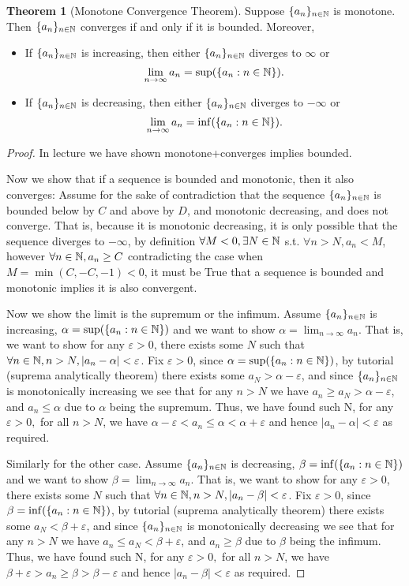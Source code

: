 \documentclass{homework}
\newcommand{\N}{\bb{N}} %
\newcommand{\ra}{\rightarrow}
\newcommand{\?}{\stackrel{?}{=}}
\newcommand{\ep}{\varepsilon}
\theoremstyle{definition}
\newtheorem*{theorem}{Theorem}
\begin{document}
\begin{theorem}
    [Monotone Convergence Theorem] Suppose $\{a_n\}_{n\in\N}$ is monotone. Then $\{a_n\}_{n\in\N}$ converges if and only if it is bounded. Moreover,
    \begin{itemize}
        \item If $\{a_n\}_{n\in\N}$ is increasing, then either $\{a_n\}_{n\in\N}$ diverges to $\infty$ or \[\lim_{n\ra\infty}a_n=\sup(\{a_n:n\in\N\}).\]
        \item If $\{a_n\}_{n\in\N}$ is decreasing, then either $\{a_n\}_{n\in\N}$ diverges to $-\infty$ or \[\lim_{n\ra\infty}a_n=\inf(\{a_n:n\in\N\}).\]
    \end{itemize}
\begin{proof}
    In lecture we have shown monotone+converges implies bounded.  
    
    Now we show that if a sequence is bounded and monotonic, then it also converges: Assume for the sake of contradiction that the sequence $\{a_n\}_{n\in\N}$ is bounded below by $C$ and above by $D$, and monotonic decreasing, and does not converge. That is, because it is monotonic decreasing, it is only possible that the sequence diverges to $-\infty$, by definition $\forall M<0, \exists N\in\N$ s.t. $\forall n>N, a_n<M$, however $\forall n\in\N, a_n\geq C$ contradicting the case when $M=\min(C,-C,-1)<0$, it must be True that a sequence is bounded and monotonic implies it is also convergent.

    Now we show the limit is the supremum or the infimum. Assume $\{a_n\}_{n\in\N}$ is increasing, $\alpha = \sup(\{a_n : n\in\N\})$ and we want to show $\alpha = \lim_{n\ra\infty}a_n$. That is, we want to show for any $\ep>0$, there exists some $N$ such that $\forall n\in\N, n>N, |a_n-\alpha|<\ep$. Fix $\ep>0$, since $\alpha=\sup(\{a_n:n\in\N\})$, by tutorial (suprema analytically theorem) there exists some $a_N>\alpha-\ep$, and since $\{a_n\}_{n\in\N}$ is monotonically increasing we see that for any $n>N$ we have $a_n\geq a_N>\alpha-\ep$, and $a_n\leq\alpha$ due to $\alpha$ being the supremum. Thus, we have found such N, for any $\ep>0,$ for all $n>N$, we have $\alpha-\ep<a_n\leq\alpha<\alpha+\ep$ and hence $|a_n-\alpha|<\ep$ as required. 

    Similarly for the other case. Assume $\{a_n\}_{n\in\N}$ is decreasing, $\beta = \inf(\{a_n : n\in\N\})$ and we want to show $\beta = \lim_{n\ra\infty}a_n$. That is, we want to show for any $\ep>0$, there exists some $N$ such that $\forall n\in\N, n>N, |a_n-\beta|<\ep$. Fix $\ep>0$, since $\beta=\inf(\{a_n:n\in\N\})$, by tutorial (suprema analytically theorem) there exists some $a_N<\beta+\ep$, and since $\{a_n\}_{n\in\N}$ is monotonically decreasing we see that for any $n>N$ we have $a_n\leq a_N<\beta+\ep$, and $a_n\geq\beta$ due to $\beta$ being the infimum. Thus, we have found such N, for any $\ep>0,$ for all $n>N$, we have $\beta+\ep>a_n\geq\beta>\beta-\ep$ and hence $|a_n-\beta|<\ep$ as required. 
\end{proof}
\end{theorem}
\end{document}
